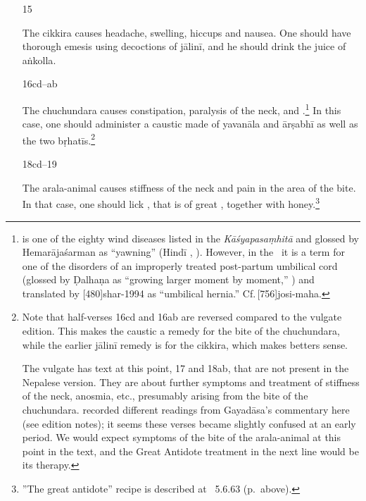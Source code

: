 \begin{translation}
\begin{itemize}
\item[15]

The \Gls{cikkira} causes headache, swelling, hiccups and nausea.  One
should have thorough emesis using
decoctions of \gls{jālinī}, and he should drink
the juice of \gls{aṅkolla}.

\item[16cd--ab]

The \Gls{chuchundara} causes constipation, paralysis of the neck, and
.\footnote{ is one of the
    eighty wind diseases listed in the \emph{Kāśyapasaṃhitā} and glossed
    by Hemarājaśarman as “yawning” (Hindī ,
    ). However, in the \CS\ it is a term for one
    of the disorders of an improperly treated post-partum umbilical cord
    (glossed by Ḍalhaṇa as  “growing larger
    moment by moment,” ) and translated by
    [480]{shar-1994} as “umbilical hernia.”
    Cf.\,[756]{josi-maha}.} %
    In this case, one should administer a caustic made of
    \gls{yavanāla} and \gls{ārṣabhī} as well as the two
    \glspl{bṛhatī}.\footnote{Note that half-verses 16cd and 16ab are
        reversed compared to the vulgate edition.  This makes the caustic
        a remedy for the bite of the \Gls{chuchundara}, while the
        earlier \gls{jālinī} remedy is for the \Gls{cikkira}, which makes
        betters sense.
        
        The vulgate has text at this point, 17 and 18ab, that are not
present in the Nepalese version.  They are about further
symptoms and treatment of stiffness of the neck, anosmia,
etc., presumably arising from the bite of the
\Gls{chuchundara}.  recorded different
readings from Gayadāsa's commentary here (see edition notes);
it seems these verses became slightly confused at an early
period. We would expect symptoms of the bite of the
\Gls{arala-animal} at this point in the text, and the Great Antidote
treatment in the next line would be its therapy.}

    
\item[18cd--19]

The \Gls{arala-animal} causes stiffness of the neck and pain in the area of the bite.
In that case, one should lick , that
is of great , together with honey.\footnote{”The great
    antidote” recipe is described at \SS\ 5.6.63 (p.\,\pageref{mahāgada}
    above).}


\end{itemize}
\end{translation}
